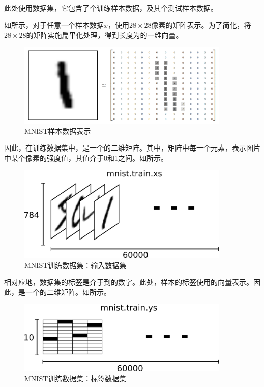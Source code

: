 \begin{content}

此处使用数据集，它包含了个训练样本数据，及其个测试样本数据。

如所示，对于任意一个样本数据$x$，使用$28 \times 28$像素的矩阵表示。为了简化，将$28 \times 28$的矩阵实施扁平化处理，得到长度为的一维向量。

\begin{figure}[H]
\centering
\includegraphics[width=0.9\textwidth]{figures/mnist-x.png}
\caption{MNIST样本数据表示}
 \label{fig:mnist-x}
\end{figure}

因此，在训练数据集中，是一个\code{[60000, 784]}的二维矩阵。其中，矩阵中每一个元素，表示图片中某个像素的强度值，其值介于0和1之间。如所示。

\begin{figure}[H]
\centering
\includegraphics[width=0.9\textwidth]{figures/mnist-train-xs.png}
\caption{MNIST训练数据集：输入数据集}
 \label{fig:mnist-train-xs}
\end{figure}

相对应地，数据集的标签是介于到的数字。此处，样本的标签使用的向量表示。因此，是一个\code{[60000, 10]}的二维矩阵。如所示。

\begin{figure}[H]
\centering
\includegraphics[width=0.9\textwidth]{figures/mnist-train-ys.png}
\caption{MNIST训练数据集：标签数据集}
 \label{fig:mnist-train-ys}
\end{figure}

\end{content}

